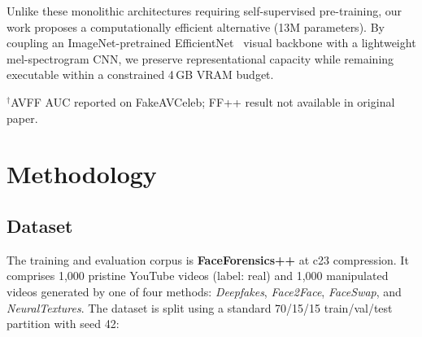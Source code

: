 \documentclass[conference]{IEEEtran}
\begin{document}
Unlike these monolithic architectures requiring self-supervised pre-training, our work proposes a computationally efficient alternative (13M parameters). By coupling an ImageNet-pretrained EfficientNet~\cite{tan2019efficientnet} visual backbone with a lightweight mel-spectrogram CNN, we preserve representational capacity while remaining executable within a constrained 4\,GB VRAM budget.

\begin{table}[t]
  \centering
  \caption{Comparison of Select Deepfake Detection Methodologies}
  \label{tab:lit_comparison}
  \begin{flushleft}
    \footnotesize $^{\dagger}$AVFF AUC reported on FakeAVCeleb; FF++ result not available in original paper.
  \end{flushleft}
\end{table}

\section{Methodology}
\label{sec:method}

\subsection{Dataset}
\label{sec:dataset}

The training and evaluation corpus is \textbf{FaceForensics++} at c23 compression. 
It comprises 1,000 pristine YouTube videos (label: real) and 1,000 manipulated videos 
generated by one of four methods: \textit{Deepfakes}, \textit{Face2Face}, \textit{FaceSwap}, 
and \textit{NeuralTextures}. The dataset is split using a standard 70/15/15 
train/val/test partition with seed 42:
\end{document}
